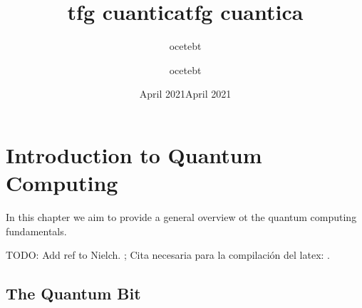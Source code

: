 
\chapter{Introduction to Quantum Computing}

In this chapter we aim to provide a general overview ot the quantum computing fundamentals.

TODO: Add ref to Nielch. ; Cita necesaria para la compilación del latex: 
\cite{Smith1981}.

\section{The Quantum Bit}



\documentclass{article}
\usepackage[utf8]{inputenc}

\title{tfg cuantica}
\author{ocetebt }
\date{April 2021}

\documentclass{article}
\usepackage[utf8]{inputenc}

\usepackage{graphicx}

\title{tfg cuantica}
\author{ocetebt }
\date{April 2021}


	
	
	
	In this chapter we aim to provide a general overview to the quantum computing fundamentals required to understand. This development will be based on %
	
